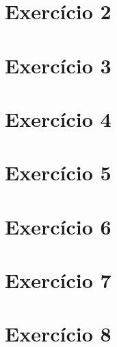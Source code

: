\documentclass[a4paper,12pt]{article}
\begin{document}
\section*{Exercício 2}
\section*{Exercício 3}
\section*{Exercício 4}
\section*{Exercício 5}
\section*{Exercício 6}
\section*{Exercício 7}
\section*{Exercício 8}
\end{document}

